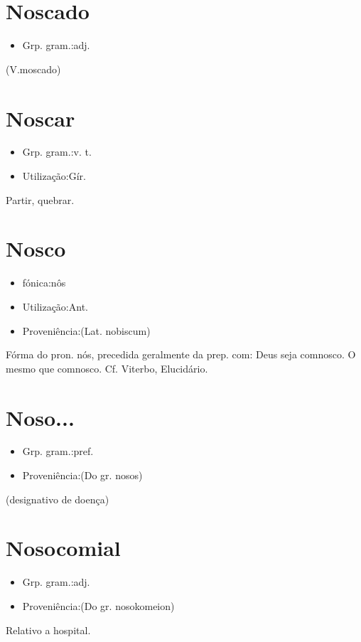 \section{Noscado}
\begin{itemize}
\item {Grp. gram.:adj.}
\end{itemize}
(V.moscado)
\section{Noscar}
\begin{itemize}
\item {Grp. gram.:v. t.}
\end{itemize}
\begin{itemize}
\item {Utilização:Gír.}
\end{itemize}
Partir, quebrar.
\section{Nosco}
\begin{itemize}
\item {fónica:nôs}
\end{itemize}
\begin{itemize}
\item {Utilização:Ant.}
\end{itemize}
\begin{itemize}
\item {Proveniência:(Lat. \textunderscore nobiscum\textunderscore )}
\end{itemize}
Fórma do pron. \textunderscore nós\textunderscore , precedida geralmente da prep. \textunderscore com\textunderscore : \textunderscore Deus seja comnosco\textunderscore .
O mesmo que \textunderscore comnosco\textunderscore . Cf. Viterbo, \textunderscore Elucidário\textunderscore .
\section{Noso...}
\begin{itemize}
\item {Grp. gram.:pref.}
\end{itemize}
\begin{itemize}
\item {Proveniência:(Do gr. \textunderscore nosos\textunderscore )}
\end{itemize}
(designativo de \textunderscore doença\textunderscore )
\section{Nosocomial}
\begin{itemize}
\item {Grp. gram.:adj.}
\end{itemize}
\begin{itemize}
\item {Proveniência:(Do gr. \textunderscore nosokomeion\textunderscore )}
\end{itemize}
Relativo a hospital.
